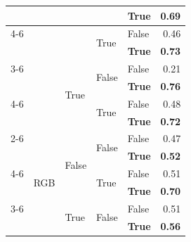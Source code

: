 \documentclass{article}
\begin{document}
\begin{table}
\begin{center}
{\begin{tabular}{@{}lllllr@{}}
                                &                                   &                           &                           & \textbf{True}         & \textbf{0.69} \\
    \cmidrule{4-6}
                                &                                   &                           & \multirow[c]{2}{*}{True}  & False                 & 0.46 \\
                                &                                   &                           &                           & \textbf{True}         & \textbf{0.73} \\
    \cmidrule{3-6}
                                &                                   & \multirow[c]{4}{*}{True}  & \multirow[c]{2}{*}{False} & False                 & 0.21 \\
                                &                                   &                           &                           & \textbf{True}         & \textbf{0.76} \\
    \cmidrule{4-6}
                                &                                   &                           & \multirow[c]{2}{*}{True}  & False                 & 0.48 \\
                                &                                   &                           &                           & \textbf{True}         & \textbf{0.72} \\
    \cmidrule{2-6}
                                & \multirow[c]{9}{*}{RGB}           & \multirow[c]{4}{*}{False} & \multirow[c]{2}{*}{False} & False                 & 0.47 \\
                                &                                   &                           &                           & \textbf{True}         & \textbf{0.52} \\
    \cmidrule{4-6}
                                &                                   &                           & \multirow[c]{2}{*}{True}  & False                 & 0.51 \\
                                &                                   &                           &                           & \textbf{True}         & \textbf{0.70} \\
    \cmidrule{3-6}
                                &                                   & \multirow[c]{4}{*}{True}  & \multirow[c]{2}{*}{False} & False                 & 0.51 \\
                                &                                   &                           &                           & \textbf{True}         & \textbf{0.56} \\

\end{tabular}}
\end{center}
\end{table}
\end{document}
